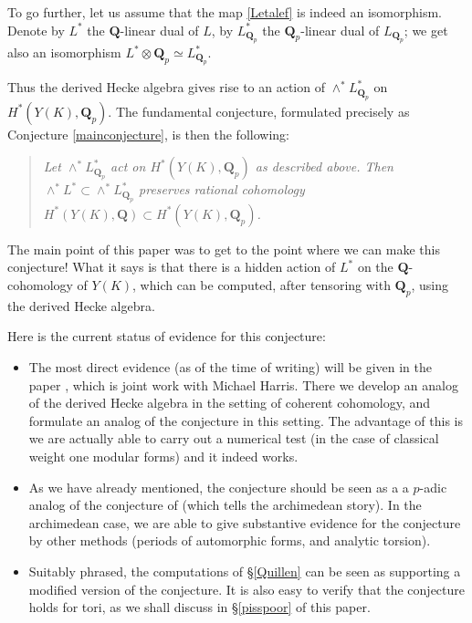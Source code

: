 \documentclass[10pt]{amsart}
\newcommand{\Q}{\mathbf{Q}}
\theoremstyle{remark}
\begin{document}
  

  
  
  To go further, let us assume that the map \eqref{Letalef} is indeed an isomorphism. Denote by $L^*$ the $\Q$-linear dual of $L$,
by $L_{\Q_p}^*$ the $\Q_p$-linear dual of $L_{\Q_p}$; we get also an isomorphism $L^* \otimes \Q_p \simeq L^*_{\Q_p}$. 

  
    
  
  
  

 
Thus the derived Hecke algebra gives rise to an action of $\wedge^* L^*_{\Q_p}$
 on $H^*(Y(K), \Q_p)$. The fundamental conjecture, formulated precisely  as Conjecture
\ref{mainconjecture},  is then the following: 
 \begin{quote} 
{\em Let $\wedge^* L^*_{\Q_p}$ act
 on $H^*(Y(K), \Q_p)$  as described above. Then $\wedge^* L ^*\subset \wedge^* L^*_{\Q_p}$ preserves rational cohomology $H^*(Y(K), \Q) \subset H^*(Y(K), \Q_p)$.  }
\end{quote}


 
 The main point of this paper was  to get to the point where we can make this conjecture!  
What it says is that there is a hidden action of $L^*$ on the $\Q$-cohomology of $Y(K)$,
which can be computed, after tensoring with $\Q_p$, using the derived Hecke algebra. 

Here is the current status of evidence for this conjecture:

 \begin{itemize}
 \item[(i)] The most direct evidence (as of the time of writing) will be given in the paper \cite{HV}, which is joint work with
 Michael Harris. 
 There we develop an analog of the derived Hecke algebra in the setting of coherent cohomology, and formulate
 an analog of the conjecture in this setting. The advantage of this is we are actually able to carry out a numerical test
 (in the case of classical weight one modular forms) and it indeed works.
 
\item[(ii)]    As we have already mentioned,  the conjecture  should be seen as a a $p$-adic analog of the conjecture of \cite{PV} (which tells the archimedean story).
In the archimedean case, we  are able to give substantive evidence for the conjecture by other methods (periods of automorphic forms, and analytic torsion). 

 \item[(iii)] Suitably phrased, the computations of \S \ref{Quillen} can be seen as supporting a modified version of the conjecture. 
It is also easy to verify that the conjecture holds for tori, as we shall discuss in  \S \ref{pisspoor} of this paper.
\end{itemize}
\end{document}

